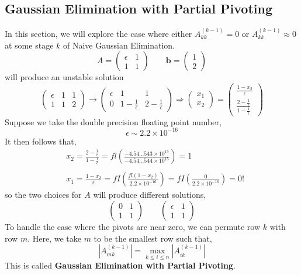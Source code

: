 \subsection{Gaussian Elimination with Partial Pivoting}
In this section, we will explore the case where either $A_{kk}^{(k-1)} = 0$ or $A_{kk}^{(k-1)} \approx 0$ at some stage $k$ of Naive Gaussian Elimination.
\[A=\left(\begin{array}{ll}
\epsilon & 1 \\
1 & 1
\end{array}\right) \quad \quad \mathbf{b}=\left(\begin{array}{l}
1 \\
2
\end{array}\right)\]
will produce an unstable solution
\[\left(\begin{array}{cc|c}
\epsilon & 1 & 1 \\
1 & 1 & 2
\end{array}\right) \rightarrow\left(\begin{array}{cc|c}
\epsilon & 1 & 1 \\
0 & 1-\frac{1}{\epsilon} & 2-\frac{1}{\epsilon}
\end{array}\right) \Rightarrow\left(\begin{array}{c}
x_1 \\
x_2
\end{array}\right)=\left(\begin{array}{c}
\frac{1-x_2}{\epsilon} \\
\frac{2-\frac{1}{\epsilon}}{1-\frac{1}{\epsilon}}
\end{array}\right)\]
Suppose we take the double precision floating point number,
\[\epsilon \sim 2.2 \times 10^{-16}\]
It then follows that,
\begin{align*}
	&x_2=\frac{2-\frac{1}{\epsilon}}{1-\frac{1}{\epsilon}}
	=f l\left(\frac{-4.54 \ldots 543 \times 10^{15}}{-4.54 \ldots 544 \times 10^{15}}\right)=1 \\ \\
	&x_1=\frac{1-x_2}{\epsilon}=f I\left(\frac{f l\left(1-x_2\right)}{2.2 \times 10^{-16}}\right)=f I\left(\frac{0}{2.2 \times 10^{-16}}\right)=0 !
\end{align*}
so the two choices for $A$ will produce different solutions,
\[\left(\begin{array}{ll}
0 & 1 \\
1 & 1
\end{array}\right) \quad \quad \left(\begin{array}{ll}
\epsilon & 1 \\
1 & 1
\end{array}\right)\]
To handle the case where the pivots are near zero, we can permute row $k$ with row $m$. Here, we take $m$ to be the smallest row such that,
\[\left|A_{m k}^{(k-1)}\right|=\max _{k \leq i \leq n}\left|A_{i k}^{(k-1)}\right|\]
This is called \textbf{Gaussian Elimination with Partial Pivoting}.


